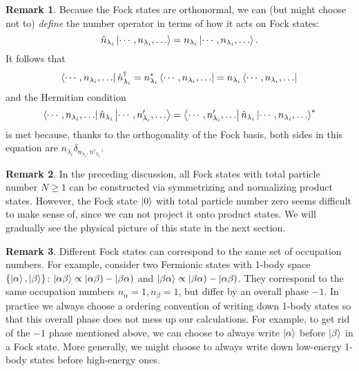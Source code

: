 \documentclass{article}
\theoremstyle{definition}
\newtheorem{rem}{Remark}[section]
\theoremstyle{plain}
\numberwithin{equation}{section}
\begin{document}
    \begin{rem}
        \label{rem:from-Fock-states-to-number-operator}
        Because the Fock states are orthonormal, 
        we can (but might choose not to) 
        \textit{define} the number operator 
        in terms of how it acts on Fock states: 
        \[
            \hat{n}_{\lambda_{i}}
            \ket{\cdots ,n_{\lambda_{i}}, \ldots }
            =
            n_{\lambda_{i}}
            \ket{\cdots ,n_{\lambda_{i}}, \ldots }.
        \]
        It follows that 
        \[
            \bra{\cdots ,n_{\lambda_{i}}, \ldots }
            \hat{n}^{\dagger}_{\lambda_{i}}
            =
            n^{*}_{\lambda_{i}}
            \bra{\cdots ,n_{\lambda_{i}}, \ldots }
            =
            n_{\lambda_{i}}
            \bra{\cdots ,n_{\lambda_{i}}, \ldots }
        \]
        and the Hermitian condition 
        \[
            \bra{\cdots ,n_{\lambda_{i}}, \ldots }
            \hat{n}_{\lambda_{i}}
            \ket{\cdots ,n'_{\lambda_{i}}, \ldots }
            =
            \bra{\cdots ,n'_{\lambda_{i}}, \ldots }
            \hat{n}_{\lambda_{i}}
            \ket{\cdots ,n_{\lambda_{i}}, \ldots }^{*}
        \]
        is met because, thanks to the 
        orthogonality of the Fock basis, both sides 
        in this equation are 
        $n_{\lambda_{i}} \delta_{n_{\lambda_{i}},n'_{\lambda_{i}}} $.
    \end{rem}

    \begin{rem}
        In the preceding discussion, 
        all Fock states with total particle number 
        $N\ge 1$ can be constructed 
        via symmetrizing and normalizing 
        product states. 
        However, the Fock state $\ket{0}$ 
        with total particle number zero 
        seems difficult to make sense of, 
        since we can not project it onto 
        product states. 
        We will gradually see the 
        physical picture of this state 
        in the next section.
    \end{rem}

    \begin{rem}
        Different Fock states 
        can correspond to the same set of 
        occupation numbers. 
        For example, 
        consider two Fermionic states 
        with 1-body space 
        $\{\ket{\alpha},\ket{\beta}\}$: 
        $\ket{\alpha \beta} \propto |\alpha \beta) - |\beta \alpha)$ 
        and 
        $\ket{\beta \alpha} \propto |\beta \alpha) - |\alpha \beta)$. 
        They correspond to the same 
        occupation numbers 
        $n_{\alpha}=1, n_{\beta}=1$, 
        but differ by an overall phase $-1$. 
        In practice we always choose a ordering 
        convention of writing down 1-body states 
        so that this overall phase does not mess up 
        our calculations. 
        For example, 
        to get rid of the $-1$ phase mentioned above, 
        we can choose to always write 
        $\ket{\alpha}$ before $\ket{\beta}$ 
        in a Fock state. 
        More generally, we might choose to always 
        write down low-energy 1-body states 
        before high-energy ones. 
    \label{rem:partially-normalized-states-can-differ-by-overall-sign}
    \end{rem}
\end{document}
